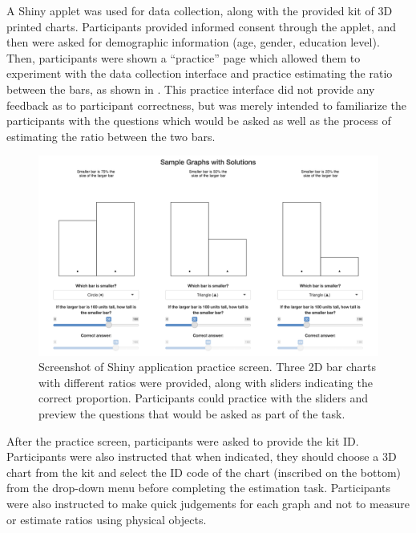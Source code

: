 \documentclass[letterpaper,inpress,dvipsnames]{jdsart}
\begin{document}
A Shiny applet was used for data collection, along with the provided kit of 3D printed charts.
Participants provided informed consent through the applet, and then were asked for demographic information (age, gender, education level).
Then, participants were shown a ``practice'' page which allowed them to experiment with the data collection interface and practice estimating the ratio between the bars, as shown in . This practice interface did not provide any feedback as to participant correctness, but was merely intended to familiarize the participants with the questions which would be asked as well as the process of estimating the ratio between the two bars.

\begin{figure}
\includegraphics[width=0.8\linewidth]{_images/03-Practice-2} \caption{Screenshot of Shiny application practice screen. Three 2D bar charts with different ratios were provided, along with sliders indicating the correct proportion. Participants could practice with the sliders and preview the questions that would be asked as part of the task.}\label{fig:practice}
\end{figure}

After the practice screen, participants were asked to provide the kit ID. Participants were also instructed that when indicated, they should choose a 3D chart from the kit and select the ID code of the chart (inscribed on the bottom) from the drop-down menu before completing the estimation task.
Participants were also instructed to make quick judgements for each graph and not to measure or estimate ratios using physical objects.
\end{document}
